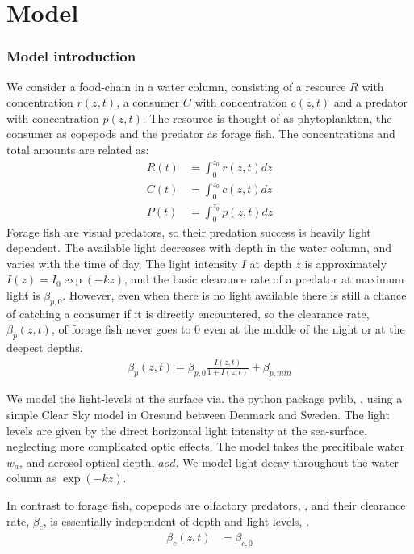 
\section{Model}

\subsubsection*{Model introduction}
We consider a food-chain in a water column, consisting of a resource $R$ with concentration $r(z,t)$, a consumer $C$ with concentration $c(z,t)$ and a predator with concentration $p(z,t)$. The resource is thought of as phytoplankton, the consumer as copepods and the predator as forage fish. The concentrations and total amounts are related as:
\begin{align}
        R(t) &= \int_0^{z_0} r(z,t) dz \\
	      C(t) &= \int_0^{z_0} c(z,t) dz \\
	      P(t) &= \int_0^{z_0} p(z,t) dz
\end{align}
Forage fish are visual predators, so their predation success is heavily light dependent. The available light decreases with depth in the water column, and varies with the time of day.
The light intensity $I$ at depth $z$ is approximately $I(z) = I_0\exp(-kz)$, and the basic clearance rate of a predator at maximum light is $\beta_{p,0}$.  However, even when there is no light available there is still a chance of catching a consumer if it is directly encountered,  so the clearance rate, $\beta_p(z,t)$, of forage fish never goes to 0 even at the middle of the night or at the deepest depths.
\begin{align}
  \beta_p(z,t) = \beta_{p,0} \frac{I(z,t)}{1+I(z,t)} + \beta_{p,min}
\end{align}


We model the light-levels at the surface via. the python package pvlib, \citep{}, using a simple Clear Sky model in Oresund between Denmark and Sweden. The light levels are given by the direct horizontal light intensity at the sea-surface, neglecting more complicated optic effects. The model takes the precitibale water $w_a$, and aerosol optical depth, $aod$. We model light decay throughout the water column as $\exp(-kz)$.


In contrast to forage fish, copepods are olfactory predators, \citep{}, and their clearance rate, $\beta_c$, is essentially independent of depth and light levels, \citep{}.
\begin{align}
	\beta_c(z,t) &=  \beta_{c,0}
\end{align}

